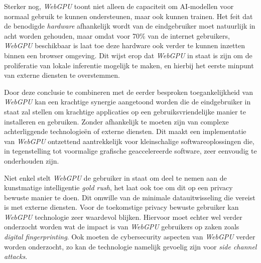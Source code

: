 \bigbreak{}

Sterker nog, \textit{WebGPU} toont niet alleen de capaciteit om  AI-modellen voor normaal gebruik te kunnen ondersteunen, maar ook kunnen trainen. Het feit dat de benodigde \textit{hardware} afhankelijk wordt van de eindgebruiker moet natuurlijk in acht worden gehouden, maar omdat voor 70\% van de internet gebruikers, \textit{WebGPU} beschikbaar is laat toe deze hardware ook verder te kunnen inzetten binnen een browser omgeving. Dit wijst erop dat \textit{WebGPU} in staat is zijn om de proliferatie van lokale inferentie mogelijk te maken, en hierbij het eerste minpunt van externe diensten te overstemmen.

\bigbreak{}

Door deze conclusie te combineren met de eerder besproken toegankelijkheid van \textit{WebGPU} kan een krachtige synergie aangetoond worden die de eindgebruiker in staat zal stellen om krachtige applicaties op een gebruiksvriendelijke manier te installeren en gebruiken. Zonder afhankelijk te moeten zijn van complexe achterliggende technologieën of externe diensten. Dit maakt een implementatie van \textit{WebGPU} ontzettend aantrekkelijk voor kleinschalige softwareoplossingen die, in tegenstelling tot voormalige grafische geaccelereerde software, zeer eenvoudig te onderhouden zijn.


\bigbreak{}

Niet enkel stelt \textit{WebGPU} de gebruiker in staat om deel te nemen aan de kunstmatige intelligentie \textit{gold rush}, het laat ook toe om dit op een privacy bewuste manier te doen. Dit omwille van de minimale datauitwisseling die vereist is met externe diensten. Voor de toekomstige privacy bewuste gebruiker kan \textit{WebGPU} technologie zeer waardevol blijken. Hiervoor moet echter wel verder onderzocht worden wat de impact is van \textit{WebGPU} gebruikers op zaken zoals \textit{digital fingerprinting}. Ook moeten de cybersecurity aspecten van \textit{WebGPU} verder worden onderzocht, zo kan de technologie namelijk gevoelig zijn voor \textit{side channel attacks}.

\bigbreak{}
\iffalse
TODO Beschrijf dat er verder moet onderzocht worden welke apparaten in staat zijn welke modellen te kunnen ondersteunen, dat hier verder onderzoek naar moet worden uitgevoerd, en dat dit merkbaar was bij het uitvoeren van chatgpu.

- Ik heb gelezen dat \textit{WebGPU} beschikbaar is voor desktops/laptops, maar ook in mobiele browsers. In hoeverre zijn de GPU's van al deze toestellen sterk genoeg? Is dit een aspect waar rekening moet mee gehouden worden bij het beschikbaar stellen van software die \textit{WebGPU} gebruikt 
\fi

